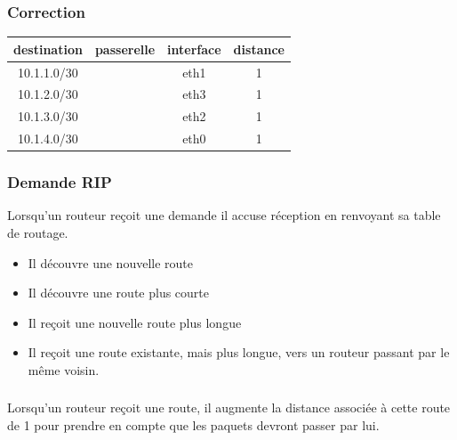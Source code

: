 \documentclass[svgnames,11pt]{beamer}
\begin{document}
\begin{frame}
    \frametitle{Correction}

    \begin{center}
        \begin{tabular}{|*{4}{c|}}
            \hline
            destination    & passerelle & interface & distance \\
            \hline
            10.1.1.0/30    &            & eth1      & 1        \\
            \hline
            10.1.2.0/30    &            & eth3      & 1        \\
            \hline
            10.1.3.0/30    &            & eth2      & 1        \\
            \hline
            10.1.4.0/30    &            & eth0      & 1        \\
            \hline
        \end{tabular}
    \end{center}

\end{frame}
\begin{frame}
    \frametitle{Demande RIP}
    Lorsqu'un routeur reçoit une demande il accuse réception en renvoyant sa table de routage. 
    \begin{itemize}
        \item<1-> Il découvre une nouvelle route
        \item<2-> Il découvre une route plus courte
        \item<3-> Il reçoit une nouvelle route plus longue 
        \item<4-> Il reçoit une route existante, mais plus longue, vers un routeur passant par le même voisin. 
    \end{itemize}

\end{frame}


\begin{frame}
    \frametitle{}

    \begin{aretenir}[Remarque]
        Lorsqu’un routeur reçoit une route, il augmente la distance associée à cette route de 1 pour prendre en compte que les paquets devront passer par
        lui.
    \end{aretenir}

\end{frame}
\end{document}
